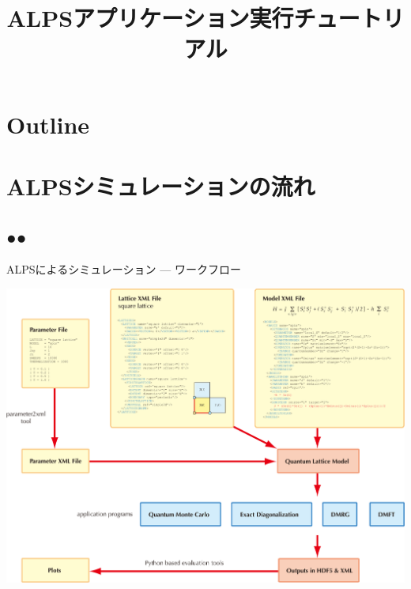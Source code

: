 \title{ALPSアプリケーション実行チュートリアル}




\begin{frame}
  \titlepage
\end{frame}

\section*{Outline}
\begin{frame}
   \tableofcontents
\end{frame}

\section{ALPSシミュレーションの流れ}
\subsection*{{\protect\color{red}●}{\protect\color{blue}●}}

\begin{frame}{ALPSによるシミュレーション --- ワークフロー}
  \begin{center}
    \includegraphics[height=0.8\textheight]{workflow.pdf}
  \end{center}
\end{frame}

